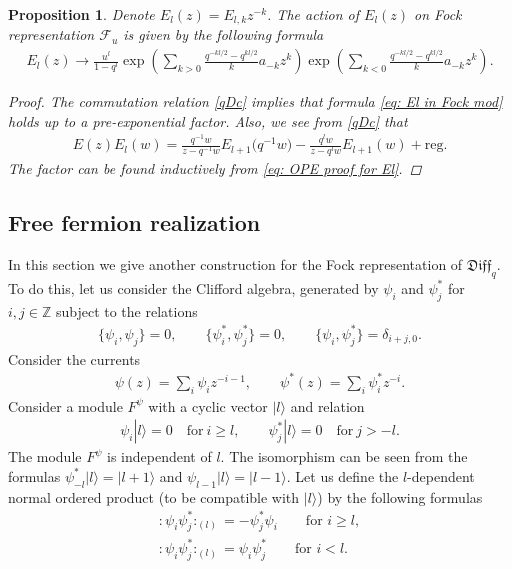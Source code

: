 \documentclass[11pt]{article}
\numberwithin{equation}{section}
\newtheorem{Proposition}[Theorem]{Proposition}
\theoremstyle{definition}
\newcommand{\n}{|l \rangle}
\newcommand{\qD}{\mathfrak{Diff}_q}
\begin{document}
\begin{Proposition} \label{E_l}
Denote $E_l(z) = E_{l, k} z^{-k}$. The action of $E_l(z)$ on Fock representation $\mathcal{F}_u$ is given by the following formula
\begin{gather} \label{eq: El in Fock mod}
E_l(z) \rightarrow \frac{u^l}{1-q^l} \exp \! \left( \sum_{k>0} \frac{q^{-kl/2}-q^{kl/2}}{k} a_{-k} z^k \right) \exp \! \left( \sum_{k<0} \frac{q^{-kl/2}-q^{kl/2}}{k} a_{-k} z^k \right).
\end{gather}
\begin{proof}
The commutation relation \eqref{qDc} implies that formula \eqref{eq: El in Fock mod} holds up to a pre-exponential factor. Also, we see from \eqref{qDc} that
\begin{gather} \label{eq: OPE proof for El}
E(z) E_l(w) = \frac{q^{-1}w}{z-q^{-1}w} E_{l+1}\big(q^{-1}w\big) - \frac{q^l w }{z-q^l w} E_{l+1}(w) + \mathrm{reg}.
\end{gather}
The factor can be found inductively from \eqref{eq: OPE proof for El}.
\end{proof}
\end{Proposition}

\subsection{Free fermion realization} \label{fermi}

In this section we give another construction for the Fock representation of $\qD$. To do this, let us consider the Clifford algebra, generated by $\psi_i$ and $\psi^*_j$ for $i,j \in \mathbb{Z}$ subject to the relations
\begin{gather*}
\{ \psi_i, \psi_j \} =0, \qquad \{ \psi^*_i, \psi^*_j \} =0, %
\qquad \{ \psi_i , \psi^*_j \} = \delta_{i+j, 0}. %
\end{gather*}
Consider the currents
\begin{gather*}
\psi(z) = \sum_{i} \psi_i z^{-i-1}, \qquad \psi^*(z) = \sum_i \psi^*_i z^{-i}.
\end{gather*}
Consider a module $F^\psi$ with a cyclic vector $\n$ and relation
\begin{gather*}
\psi_i \n = 0 \quad \text{for} \ i \geqslant l, \qquad \psi^*_j \n = 0 \quad \text{for} \ j > -l.
\end{gather*}
The module $F^\psi$ is independent of $l$. The isomorphism can be seen from the formulas $\psi^*_{-l} \n = | l+1 \rangle$ and $\psi_{l-1} \n = | l-1 \rangle$.
Let us define the $l$-dependent normal ordered product (to be compatible with $\n$) by the following formulas
\begin{gather}
: \! \psi_i \psi^*_j \! :_{(l)} = - \psi^*_j \psi_i \qquad \text{for } i \geqslant l, \label{norm1} \\
: \! \psi_i \psi^*_j \! :_{(l)} = \psi_i \psi^*_j \qquad \text{for } i < l. \label{norm2}
\end{gather}
\end{document}
